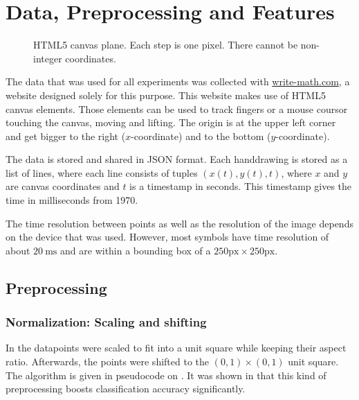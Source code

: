 \chapter{Data, Preprocessing and Features}\label{ch:preprocessing}

\begin{wrapfigure}{r}{7cm}
  \vspace{-35pt}
  \begin{center}
    
  \end{center}
  \vspace{-20pt}
  \caption{HTML5 canvas plane. Each step is one pixel. There cannot be non-integer
           coordinates.}
  \label{fig:canvas-plane}
  \vspace{-10pt}
\end{wrapfigure}

The data that was used for all experiments was collected with
\href{http://write-math.com}{write-math.com}, a website designed solely for
this purpose. This website makes use of HTML5 canvas elements. Those elements
can be used to track fingers or a mouse coursor touching the canvas, moving
and lifting. The origin is at the upper left corner and get bigger to the right
($x$-coordinate) and to the bottom ($y$-coordinate).

The data is stored and shared in JSON format. Each handdrawing is stored as a
list of lines, where each line consists of tuples $(x(t), y(t), t)$, where $x$
and $y$ are canvas coordinates and $t$ is a timestamp in seconds. This timestamp
gives the time in milliseconds from 1970.

The time resolution between points as well as the resolution of the image
depends on the device that was used. However, most symbols have time resolution
of about $\SI{20}{\milli\second}$ and are within a bounding box of a
$250 \text{px} \times 250 \text{px}$.

\section{Preprocessing}\label{sec:preprocessing}
\subsection{Normalization: Scaling and shifting}
In \cite{Kirsch} the datapoints were scaled to fit into a unit square while
keeping their aspect ratio. Afterwards, the points were shifted to
the $(0, 1) \times (0, 1)$ unit square. The algorithm is given in pseudocode on
. It was shown in \cite{Kirsch,Huang09} that
this kind of preprocessing boosts classification accuracy significantly.

